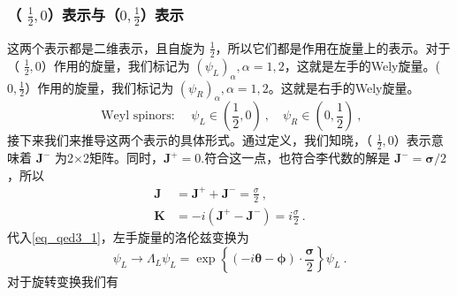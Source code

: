 \subsubsection{（ $\frac{1}{2},0$）表示与（$0,\frac{1}{2}$）表示}
这两个表示都是二维表示，且自旋为 $\frac{1}{2}$，所以它们都是作用在旋量上的表示。对于（ $\frac{1}{2},0$）作用的旋量，我们标记为 $\left(\psi_{L}\right)_{\alpha},\alpha=1,2$，这就是左手的Wely旋量。($0,\frac{1}{2}$）作用的旋量，我们标记为 $\left(\psi_{R}\right)_{\alpha},\alpha=1,2$。这就是右手的Wely旋量。
\begin{equation}
\text { Weyl spinors: } \quad \psi_{L} \in\left(\frac{1}{2}, 0\right)~, \quad \psi_{R} \in\left(0, \frac{1}{2}\right)~,
\end{equation}
接下来我们来推导这两个表示的具体形式。通过定义，我们知晓，（ $\frac{1}{2},0$）表示意味着 $\mathbf{J}^{-}$ 为2×2矩阵。同时，$\mathbf{J}^{+}=0$.符合这一点，也符合李代数的解是 $\mathbf{J}^{-}=\boldsymbol{\sigma} / 2$，所以
\begin{equation}
\begin{aligned}
\mathbf{J} &=\mathbf{J}^{+}+\mathbf{J}^{-}=\frac{\sigma}{2} ~,\\
\mathbf{K} &=-i\left(\mathbf{J}^{+}-\mathbf{J}^{-}\right)=i \frac{\sigma}{2}~.
\end{aligned}
\end{equation}
代入\autoref{eq_qed3_1}，左手旋量的洛伦兹变换为
\begin{equation}
\psi_{L} \rightarrow \Lambda_{L} \psi_{L}=\exp \left\{(-i \boldsymbol{\theta}-\boldsymbol{\phi}) \cdot \frac{\boldsymbol{\sigma}}{2}\right\} \psi_{L}~.
\end{equation}
对于旋转变换我们有
